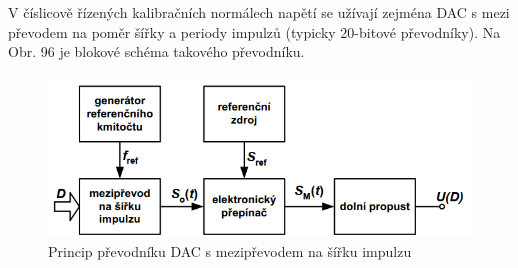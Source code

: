 V číslicově řízených kalibračních normálech napětí se užívají zejména DAC s mezi převodem na poměr šířky a periody impulzů (typicky 20-bitové převodníky). Na Obr. 96 je blokové schéma takového převodníku.
\begin{figure}[h]
   \begin{center}
     \includegraphics[scale=0.6]{images/DAneprimy.png}
   \end{center}
   \caption{Princip převodníku DAC s mezipřevodem na šířku impulzu}
\end{figure}






